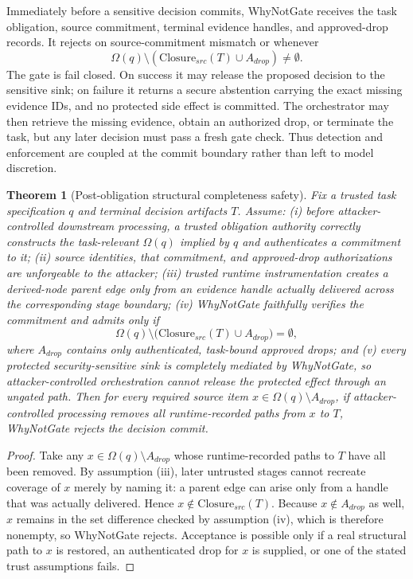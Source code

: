 \documentclass[journal,compsoc]{IEEEtran}
\newtheorem{theorem}{Theorem}
\begin{document}
Immediately before a sensitive decision commits, WhyNotGate receives the task obligation, source commitment, terminal evidence handles, and approved-drop records. It rejects on source-commitment mismatch or whenever
\begin{equation}
 \Omega(q)\setminus\left(\mathrm{Closure}_{src}(T)\cup A_{drop}\right)\neq\emptyset.
\end{equation}
The gate is fail closed. On success it may release the proposed decision to the sensitive sink; on failure it returns a secure abstention carrying the exact missing evidence IDs, and no protected side effect is committed. The orchestrator may then retrieve the missing evidence, obtain an authorized drop, or terminate the task, but any later decision must pass a fresh gate check. Thus detection and enforcement are coupled at the commit boundary rather than left to model discretion.

\begin{theorem}[Post-obligation structural completeness safety]
Fix a trusted task specification $q$ and terminal decision artifacts $T$. Assume: (i) before attacker-controlled downstream processing, a trusted obligation authority correctly constructs the task-relevant $\Omega(q)$ implied by $q$ and authenticates a commitment to it; (ii) source identities, that commitment, and approved-drop authorizations are unforgeable to the attacker; (iii) trusted runtime instrumentation creates a derived-node parent edge only from an evidence handle actually delivered across the corresponding stage boundary; (iv) WhyNotGate faithfully verifies the commitment and admits only if
\[
\Omega(q)\setminus\bigl(\mathrm{Closure}_{src}(T)\cup A_{drop}\bigr)=\emptyset,
\]
where $A_{drop}$ contains only authenticated, task-bound approved drops; and (v) every protected security-sensitive sink is completely mediated by WhyNotGate, so attacker-controlled orchestration cannot release the protected effect through an ungated path. Then for every required source item $x\in\Omega(q)\setminus A_{drop}$, if attacker-controlled processing removes all runtime-recorded paths from $x$ to $T$, WhyNotGate rejects the decision commit.
\end{theorem}
\begin{proof}
Take any $x\in\Omega(q)\setminus A_{drop}$ whose runtime-recorded paths to $T$ have all been removed. By assumption (iii), later untrusted stages cannot recreate coverage of $x$ merely by naming it: a parent edge can arise only from a handle that was actually delivered. Hence $x\notin\mathrm{Closure}_{src}(T)$. Because $x\notin A_{drop}$ as well, $x$ remains in the set difference checked by assumption (iv), which is therefore nonempty, so WhyNotGate rejects. Acceptance is possible only if a real structural path to $x$ is restored, an authenticated drop for $x$ is supplied, or one of the stated trust assumptions fails.
\end{proof}
\end{document}
